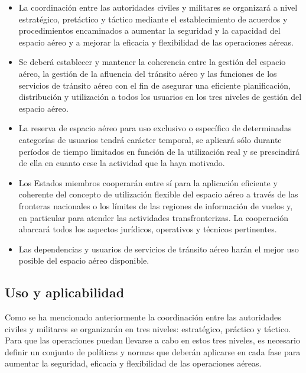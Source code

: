 \begin{itemize}
    \item La coordinación entre las autoridades civiles y militares se organizará a nivel estratégico, pretáctico y táctico mediante el establecimiento de acuerdos y procedimientos encaminados a aumentar la seguridad y la capacidad del espacio aéreo y a mejorar la eficacia y flexibilidad de las operaciones aéreas.
    
    \item Se deberá establecer y mantener la coherencia entre la gestión del espacio aéreo, la gestión de la afluencia del tránsito aéreo y las funciones de los servicios de tránsito aéreo con el fin de asegurar una eficiente planificación, distribución y utilización a todos los usuarios en los tres niveles de gestión del espacio aéreo.
    
    \item La reserva de espacio aéreo para uso exclusivo o específico de determinadas categorías de usuarios tendrá carácter temporal, se aplicará sólo durante períodos de tiempo limitados en función de la utilización real y se prescindirá de ella en cuanto cese la actividad que la haya motivado.
    
    \item Los Estados miembros cooperarán entre sí para la aplicación eficiente y coherente del concepto de utilización flexible del espacio aéreo a través de las fronteras nacionales o los límites de las regiones de información de vuelos y, en particular para atender las actividades transfronterizas. La cooperación abarcará todos los aspectos jurídicos, operativos y técnicos pertinentes.
    
    \item Las dependencias y usuarios de servicios de tránsito aéreo harán el mejor uso posible del espacio aéreo disponible.
\end{itemize}

\subsection{Uso y aplicabilidad}

Como se ha mencionado anteriormente la coordinación entre las autoridades civiles y militares se organizarán en tres niveles: estratégico, práctico y táctico. Para que las operaciones puedan llevarse a cabo en estos tres niveles, es necesario definir un conjunto de políticas y normas que deberán aplicarse en cada fase para aumentar la seguridad, eficacia y flexibilidad de las operaciones aéreas.


